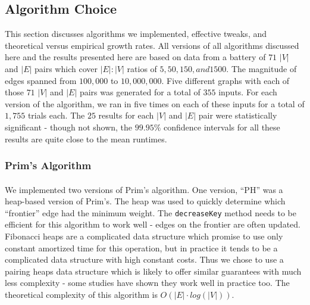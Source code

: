 \subsection{Algorithm Choice}
\label{sec:deep:algchoice}
This section discusses algorithms we implemented, effective tweaks, and
theoretical versus empirical growth rates.  All versions of all algorithms
discussed here and the results presented here are based on data from a battery
of $71$ $|V|$ and $|E|$ pairs which cover $|E|:|V|$ ratios of $5, 50, 150, and
1500$.  The magnitude of edges spanned from $100,000$ to $10,000,000$.  Five
different graphs with each of those $71$ $|V|$ and $|E|$ pairs was generated for
a total of $355$ inputs.  For each version of the algorithm, we ran in five
times on each of these inputs for a total of $1,755$ trials each.  The $25$
results for each $|V|$ and $|E|$ pair were statistically significant - though
not shown, the $99.95\%$ confidence intervals for all these results are quite
close to the mean runtimes.


\subsubsection{Prim's Algorithm}
\paragraph{}
We implemented two versions of Prim's algorithm.  One version, ``PH'' was a
heap-based version of Prim's.  The heap was used to quickly determine which
``frontier'' edge had the minimum weight.  The \texttt{decreaseKey} method needs
to be efficient for this algorithm to work well - edges on the frontier are
often updated.  Fibonacci heaps are a complicated data structure which promise
to use only constant amortized time for this operation, but in practice it tends
to be a complicated data structure with high constant costs.  Thus we chose to
use a pairing heaps data structure which is likely to offer similar guarantees
with much less complexity - some studies\cite{moret} have shown they work well
in practice too.  The theoretical complexity of this algorithm is $O(|E| \cdot
log(|V|))$.


